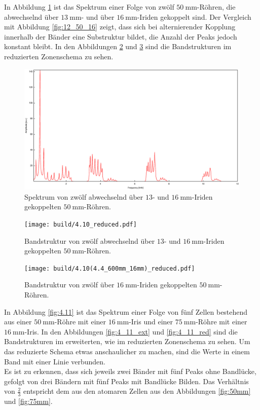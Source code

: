 \newpage
\noindent In Abbildung \ref{fig:12_50_13_16} ist das Spektrum einer Folge von zwölf $\SI{50}{\milli\meter}$-Röhren, die abwechselnd über $\SI{13}{\milli\meter}$- und über $\SI{16}{\milli\meter}$-Iriden gekoppelt sind. Der Vergleich mit Abbildung \ref{fig:12_50_16} zeigt, dass sich bei alternierender Kopplung innerhalb der Bänder eine Substruktur bildet, die Anzahl der Peaks jedoch konstant bleibt. In den Abbildungen \ref{fig:4_10} und \ref{fig:4_10(4_4)} sind die Bandstrukturen im reduzierten Zonenschema zu sehen. 

\begin{figure}
\centering
\includegraphics[width=\linewidth-60pt,height=\textheight-60pt,keepaspectratio]{FP-V23data/4.10_600mm_13_16mm.eps}
\caption{Spektrum von zwölf abwechselnd über $13$- und $\SI{16}{\milli\meter}$-Iriden gekoppelten $\SI{50}{\milli\meter}$-Röhren.}
\label{fig:12_50_13_16}
\end{figure}

\begin{figure}
\centering
\texttt{[image: build/4.10\_reduced.pdf]}
\caption{Bandstruktur von zwölf abwechselnd über $13$- und $\SI{16}{\milli\meter}$-Iriden gekoppelten $\SI{50}{\milli\meter}$-Röhren.}
\label{fig:4_10}
\end{figure}

\begin{figure}
\centering
\texttt{[image: build/4.10(4.4\_600mm\_16mm)\_reduced.pdf]}
\caption{Bandstruktur von zwölf über $\SI{16}{\milli\meter}$-Iriden gekoppelten $\SI{50}{\milli\meter}$-Röhren.}
\label{fig:4_10(4_4)}
\end{figure}

\newpage
\noindent In Abbildung \ref{fig:4.11} ist das Spektrum einer Folge von fünf Zellen bestehend aus einer $\SI{50}{\milli\meter}$-Röhre mit einer $\SI{16}{\milli\meter}$-Iris und einer $\SI{75}{\milli\meter}$-Röhre mit einer $\SI{16}{\milli\meter}$-Iris. In den Abbildungen \ref{fig:4_11_ext} und \ref{fig:4_11_red} sind die Bandstrukturen im erweiterten, wie im reduzierten Zonenschema zu sehen. Um das reduzierte Schema etwas anschaulicher zu machen, sind die Werte in einem Band mit einer Linie verbunden.\\
Es ist zu erkennen, dass sich jeweils zwei Bänder mit fünf Peaks ohne Bandlücke, gefolgt von drei Bändern mit fünf Peaks mit Bandlücke Bilden. Das Verhältnis von $\frac{2}{3}$ entspricht dem aus den atomaren Zellen aus den Abbildungen \ref{fig:50mm} und \ref{fig:75mm}.


